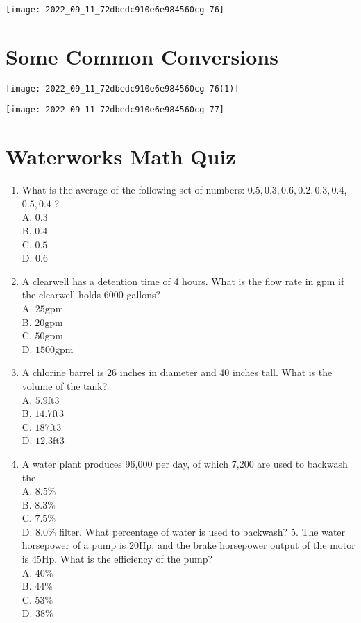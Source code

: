 \texttt{[image: 2022\_09\_11\_72dbedc910e6e984560cg-76]}

\section{Some Common Conversions}
\texttt{[image: 2022\_09\_11\_72dbedc910e6e984560cg-76(1)]}

\texttt{[image: 2022\_09\_11\_72dbedc910e6e984560cg-77]}

\section{Waterworks Math Quiz}
\begin{enumerate}
  \item What is the average of the following set of numbers: $0.5,0.3,0.6,0.2,0.3,0.4$, $0.5,0.4$ ?\\
A. $0.3$\\
B. $0.4$\\
C. $0.5$\\
D. $0.6$

  \item A clearwell has a detention time of 4 hours. What is the flow rate in gpm if the clearwell holds 6000 gallons?\\
A. $25 \mathrm{gpm}$\\
B. $20 \mathrm{gpm}$\\
C. $50 \mathrm{gpm}$\\
D. $1500 \mathrm{gpm}$

  \item A chlorine barrel is 26 inches in diameter and 40 inches tall. What is the volume of the tank?\\
A. $5.9 \mathrm{ft} 3$\\
B. $14.7 \mathrm{ft} 3$\\
C. $187 \mathrm{ft} 3$\\
D. $12.3 \mathrm{ft} 3$

  \item A water plant produces 96,000 per day, of which 7,200 are used to backwash the\\
A. $8.5 \%$\\
B. $8.3 \%$\\
C. $7.5 \%$\\
D. $8.0 \%$ filter. What percentage of water is used to backwash? 5. The water horsepower of a pump is $20 \mathrm{Hp}$, and the brake horsepower output of the motor is $45 \mathrm{Hp}$. What is the efficiency of the pump?\\
A. $40 \%$\\
B. $44 \%$\\
C. $53 \%$\\
D. $38 \%$


\end{enumerate}

